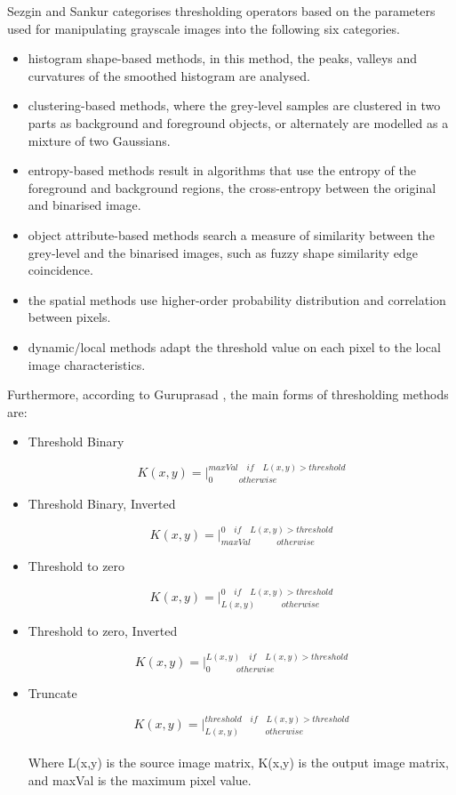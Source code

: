 Sezgin and Sankur \cite{sezgin2004survey} categorises thresholding operators based on the parameters used for manipulating grayscale images into the following six categories.

\begin{itemize}
\item histogram shape-based methods, in this method, the peaks, valleys and curvatures of the smoothed histogram are analysed.
\item clustering-based methods, where the grey-level samples are clustered in two parts as background and foreground objects, or alternately are modelled as a mixture of two Gaussians.
\item entropy-based methods result in algorithms that use the entropy of the foreground and background regions, the cross-entropy between the original and binarised image.
\item object attribute-based methods search a measure of similarity between the grey-level and the binarised images, such as fuzzy shape similarity edge coincidence.
\item the spatial methods use higher-order probability distribution and correlation between pixels.
\item dynamic/local methods adapt the threshold value on each pixel to the local image characteristics.

\end{itemize}

Furthermore, according to Guruprasad \cite{guruprasad2020overview}, the main forms of thresholding methods are:
\begin{itemize}
    \item Threshold Binary
    
    \[
    K(x,y) = \Bigg|_{0 \qquad\quad otherwise}^{maxVal \quad if \quad L(x,y) > threshold}
    \]
    
    \item Threshold Binary, Inverted
    
    \[
    K(x,y) = \Bigg|_{maxVal \qquad\quad otherwise}^{0 \quad if \quad L(x,y) > threshold}
    \]
    
    \item Threshold to zero
    
    \[
    K(x,y) = \Bigg|_{L(x,y) \qquad\quad otherwise}^{0 \quad if \quad L(x,y) > threshold}
    \]
    
    \item Threshold to zero, Inverted
    
    \[
    K(x,y) = \Bigg|_{0 \qquad\quad otherwise}^{L(x,y) \quad if \quad L(x,y) > threshold}
    \]
    
    \item Truncate
    
    \[
    K(x,y) = \Bigg|_{L(x,y) \qquad\quad otherwise}^{threshold \quad if \quad L(x,y) > threshold}
    \]\\
    Where L(x,y) is the source image matrix, K(x,y) is the output image matrix, and maxVal is the maximum pixel value.
\end{itemize}

